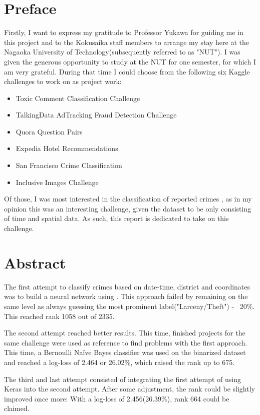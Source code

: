 \documentclass[12pt,a4paper]{scrartcl}
\begin{document}
\section{Preface}\label{s:preface}
Firstly, I want to express my gratitude to Professor Yukawa for guiding me in this project and to the Kokusaika staff members to arrange my stay here at the Nagaoka University of Technology(subsequently referred to as "NUT").
I was given the generous opportunity to study at the NUT for one semester, for which I am very grateful. During that time I could choose from the following six Kaggle challenges to work on as project work:
\begin{itemize}
\item Toxic Comment Classification Challenge \citep{kgl_toxic_comment}
\item TalkingData AdTracking Fraud Detection Challenge \citep{kgl_talking_data}
\item Quora Question Pairs \citep{kgl_quora}
\item Expedia Hotel Recommendations \citep{kgl_expedia}
\item San Francisco Crime Classification \citep{kgl_sf_crime}
\item Inclusive Images Challenge \citep{kgl_inclusive_images}
\end{itemize}
Of those, I was most interested in the classification of reported crimes \citep{kgl_sf_crime}, as in my opinion this was an interesting challenge, given the dataset to be only consisting of time and spatial data. As such, this report is dedicated to take on this challenge.

\pagebreak
\section{Abstract}\label{s:abstract}
The first attempt to classify crimes based on date-time, district and coordinates was to build a neural network using \cite{keras}. This approach failed by remaining on the same level as always guessing the most prominent label("Larceny/Theft") - ~20\%. This reached rank 1058 out of 2335.

The second attempt reached better results. This time, finished projects for the same challenge were used as reference to find problems with the first approach. This time, a Bernoulli Naïve Bayes classifier was used on the binarized dataset and reached a log-loss of 2.464 or 26.02\%, which raised the rank up to 675.

The third and last attempt consisted of integrating the first attempt of using Keras into the second attempt. After some adjustment, the rank could be slightly improved once more: With a log-loss of 2.456(26.39\%), rank 664 could be claimed.
\end{document}
